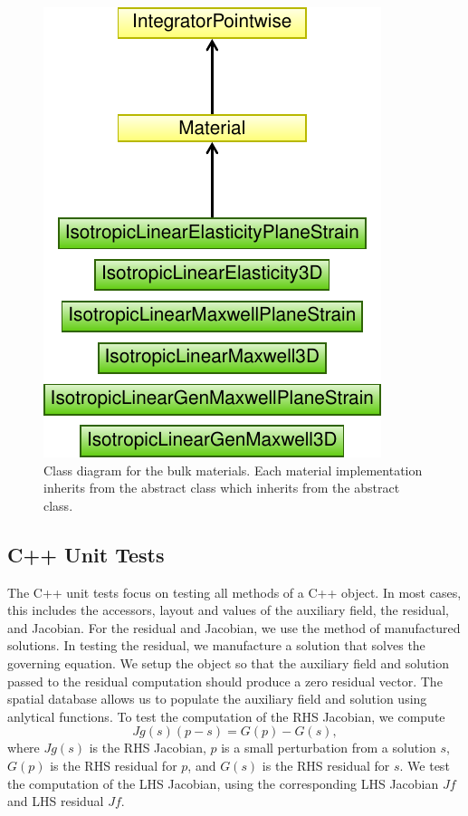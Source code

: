 \begin{figure}[htbp]
  \includegraphics[scale=0.8]{developer/figs/material_classdiagram}
  \caption{Class diagram for the bulk materials. Each material
    implementation inherits from the abstract  class
    which inherits from the abstract 
    class.}
  \label{fig:developer:material:class}
\end{figure}

\subsection{C++ Unit Tests}

The C++ unit tests focus on testing all methods of a C++ object. In most cases, this includes the accessors, layout and
values of the auxiliary field, the residual, and Jacobian. For the residual and Jacobian, we use the method of
manufactured solutions. In testing the residual, we manufacture a solution that solves the governing equation. We setup
the object so that the auxiliary field and solution passed to the residual computation should produce a zero residual
vector. The  spatial database allows us to populate the auxiliary field and solution using
anlytical functions. To test the computation of the RHS Jacobian, we compute
\begin{equation}
    Jg(s) (p - s) = G(p) - G(s),
\end{equation}
where $Jg(s)$ is the RHS Jacobian, $p$ is a small perturbation from a solution $s$, $G(p)$ is the RHS residual for $p$,
and $G(s)$ is the RHS residual for $s$. We test the computation of the LHS Jacobian, using the corresponding LHS Jacobian $Jf$
and LHS residual $Jf$.

